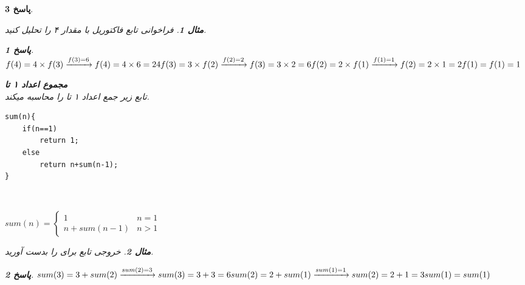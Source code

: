 \documentclass[12pt]{article}
\newtheorem{question}{مثال}[section]
\newtheorem{answer}{پاسخ}[section]
\begin{document}
\begin{answer}
\begin{question}
فراخوانی تابع فاکتوریل با مقدار ۴ را تحلیل کنید.\\
\end{question}

\begin{answer}
\begin{math}
f(4) = 4\times f(3) \xrightarrow{f(3)=6} f(4) = 4 \times 6 = 24\\
f(3) = 3\times f(2) \xrightarrow{f(2)=2} f(3) = 3 \times 2 = 6\\
f(2) = 2\times f(1) \xrightarrow{f(1)=1} f(2) = 2 \times 1 = 2 \\
f(1) = f(1) =1 \\
\end{math}
\end{answer}

\textbf{مجموع اعداد ۱ تا }\\
تابع زیر جمع اعداد ۱ تا  را محاسبه میکند.\\
\begin{latin}
\begin{lstlisting}
sum(n){
	if(n==1)
		return 1;
	else
		return n+sum(n-1);
}
\end{lstlisting}
\end{latin}\\

\begin{LTR}
\begin{math}
sum(n) =
\begin{cases}
	1 & n=1\\
	n+sum(n-1) &n>1
\end{cases}
\end{math}
\end{LTR}
\newpage

\begin{question}
خروجی تابع  برای  را بدست آورید.\\
\end{question}
\begin{answer}
\begin{math}
sum(3) = 3 + sum(2) \xrightarrow{sum(2) = 3} sum(3) = 3 + 3 = 6\\
sum(2) = 2 + sum(1) \xrightarrow{sum(1) = 1} sum(2) = 2 + 1 = 3\\
sum(1) = sum(1) \\
\end{math}
\end{answer}


\end{answer}
\end{document}
